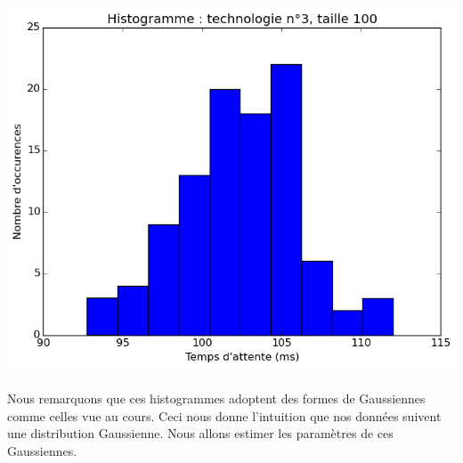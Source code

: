 \documentclass[a4paper,10pt]{article}
\begin{document}
\includegraphics[scale=0.4]{img/3-100.png}
\\
\\

Nous remarquons que ces histogrammes adoptent des formes de Gaussiennes comme celles vue au cours. Ceci nous donne l'intuition que nos données
suivent une distribution Gaussienne. Nous allons estimer les paramètres de ces Gaussiennes.
\end{document}
